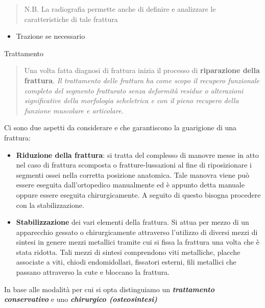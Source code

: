 \documentclass[]{article}
\begin{document}
\begin{quote}
N.B. La radiografia permette anche di definire e analizzare le
caratteristiche di tale frattura
\end{quote}

\begin{itemize}
\item
  Trazione se necessario
\end{itemize}

Trattamento

\begin{quote}
Una volta fatta diagnosi di frattura inizia il processo di
\textbf{riparazione della frattura}. \emph{Il trattamento delle frattura
ha come scopo il recupero funzionale completo del segmento fratturato
senza deformità residue o alterazioni significative della morfologia
scheletrica e con il pieno recupero della funzione muscolare e
articolare.}
\end{quote}

Ci sono due aspetti da considerare e che garantiscono la guarigione di
una frattura:

\begin{itemize}
\item
  \textbf{Riduzione della frattura}: si tratta del complesso di manovre
  messe in atto nel caso di frattura scomposta o fratture-lussazioni al
  fine di riposizionare i segmenti ossei nella corretta posizione
  anatomica. Tale manovra viene può essere eseguita dall'ortopedico
  manualmente ed è appunto detta manuale oppure essere eseguita
  chirurgicamente. A seguito di questo bisogna procedere con la
  stabilizzazione.
\end{itemize}

\begin{itemize}
\item
  \textbf{Stabilizzazione} dei vari elementi della frattura. Si attua
  per mezzo di un apparecchio gessato o chirurgicamente attraverso
  l'utilizzo di diversi mezzi di sintesi in genere mezzi metallici
  tramite cui si fissa la frattura una volta che è stata ridotta. Tali
  mezzi di sintesi comprendono viti metalliche, placche associate a
  viti, chiodi endomidollari, fissatori esterni, fili metallici che
  passano attraverso la cute e bloccano la frattura.
\end{itemize}

In base alle modalità per cui si opta distinguiamo un
\textbf{\emph{trattamento conservativo}} e uno \textbf{\emph{chirurgico
(osteosintesi)}}
\end{document}
